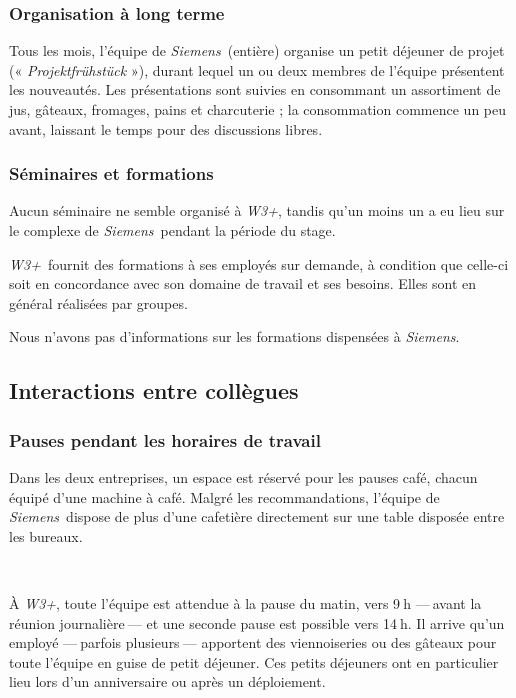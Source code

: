 \documentclass[a4paper, oneside, 12pt]{article}
\def\www{\emph{W3+}}
\def\siemens{\emph{Siemens}}
\begin{document}
\newpage

\subsubsection{Organisation à long terme}

Tous les mois, l’équipe de \siemens\ (entière) organise un petit déjeuner de projet (« \textit{Projektfrühstück} »), durant lequel un ou deux membres de l’équipe présentent les nouveautés. Les présentations sont suivies en consommant un assortiment de jus, gâteaux, fromages, pains et charcuterie ; la consommation commence un peu avant, laissant le temps pour des discussions libres.

\subsubsection{Séminaires et formations}

Aucun séminaire ne semble organisé à \www, tandis qu’un moins un a eu lieu sur le complexe de \siemens\ pendant la période du stage.

\www\ fournit des formations à ses employés sur demande, à condition que celle-ci soit en concordance avec son domaine de travail et ses besoins. Elles sont en général réalisées par groupes.

Nous n’avons pas d’informations sur les formations dispensées à \siemens.

\vfill

\subsection{Interactions entre collègues}

\subsubsection{Pauses pendant les horaires de travail}

Dans les deux entreprises, un espace est réservé pour les pauses café, chacun équipé d’une machine à café. Malgré les recommandations, l’équipe de \siemens\ dispose de plus d’une cafetière directement sur une table disposée entre les bureaux.

\ 

À \www, toute l’équipe est attendue à la pause du matin, vers 9$~$h —$~$avant la réunion journalière$~$— et une seconde pause est possible vers 14$~$h. Il arrive qu’un employé —$~$parfois plusieurs$~$— apportent des viennoiseries ou des gâteaux pour toute l’équipe en guise de petit déjeuner. Ces petits déjeuners ont en particulier lieu lors d’un anniversaire ou après un déploiement.
\end{document}

